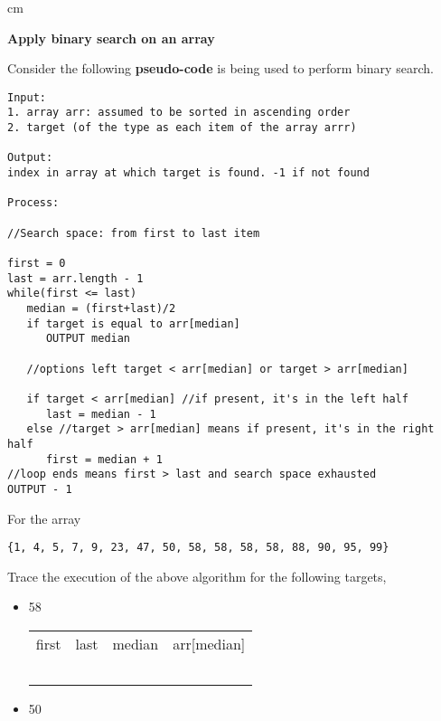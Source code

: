\begin{questions}

 cm 

\question  \textbf{Apply binary search on an array} \vskip 0.5cm

Consider the following \textbf{pseudo-code} is being used to perform binary search.

\begin{lstlisting}[numbers = none, frame = single, style = correct]
Input: 
1. array arr: assumed to be sorted in ascending order
2. target (of the type as each item of the array arrr)

Output:
index in array at which target is found. -1 if not found

Process:

//Search space: from first to last item

first = 0
last = arr.length - 1
while(first <= last)
   median = (first+last)/2
   if target is equal to arr[median]
      OUTPUT median
   
   //options left target < arr[median] or target > arr[median]

   if target < arr[median] //if present, it's in the left half
      last = median - 1
   else //target > arr[median] means if present, it's in the right half
      first = median + 1
//loop ends means first > last and search space exhausted
OUTPUT - 1	
\end{lstlisting}

For the array 

\begin{verbatim}
{1, 4, 5, 7, 9, 23, 47, 50, 58, 58, 58, 58, 88, 90, 95, 99}
\end{verbatim}

Trace the execution of the above algorithm for the following targets,

\begin{itemize}
\item 58

\begin{tabular}{c | c | c | c}
\hline
first &	last &	median &	arr[median]\\
& & & \\
& & & \\
& & & \\
& & & \\
& & & \\
\end{tabular}
\vskip 0.5cm

\item 50


\end{itemize}
\end{questions}
